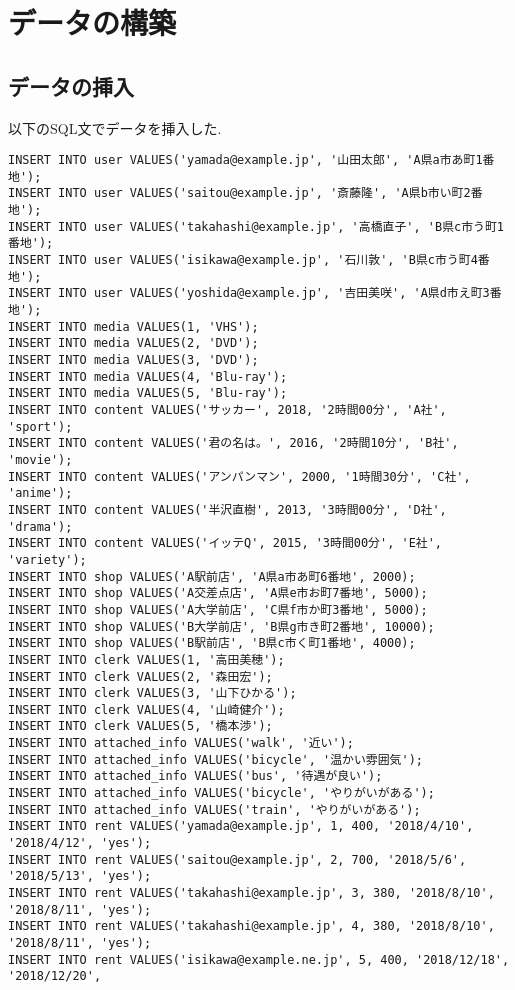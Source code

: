 \documentclass{jarticle}
\begin{document}
\section{データの構築}
\subsection{データの挿入}
以下のSQL文でデータを挿入した.
\begin{verbatim}
INSERT INTO user VALUES('yamada@example.jp', '山田太郎', 'A県a市あ町1番地');
INSERT INTO user VALUES('saitou@example.jp', '斎藤隆', 'A県b市い町2番地');
INSERT INTO user VALUES('takahashi@example.jp', '高橋直子', 'B県c市う町1番地');
INSERT INTO user VALUES('isikawa@example.jp', '石川敦', 'B県c市う町4番地');
INSERT INTO user VALUES('yoshida@example.jp', '吉田美咲', 'A県d市え町3番地');
INSERT INTO media VALUES(1, 'VHS');
INSERT INTO media VALUES(2, 'DVD');
INSERT INTO media VALUES(3, 'DVD');
INSERT INTO media VALUES(4, 'Blu-ray');
INSERT INTO media VALUES(5, 'Blu-ray');
INSERT INTO content VALUES('サッカー', 2018, '2時間00分', 'A社', 'sport');
INSERT INTO content VALUES('君の名は。', 2016, '2時間10分', 'B社', 'movie');
INSERT INTO content VALUES('アンパンマン', 2000, '1時間30分', 'C社', 'anime');
INSERT INTO content VALUES('半沢直樹', 2013, '3時間00分', 'D社', 'drama');
INSERT INTO content VALUES('イッテQ', 2015, '3時間00分', 'E社', 'variety');
INSERT INTO shop VALUES('A駅前店', 'A県a市あ町6番地', 2000);
INSERT INTO shop VALUES('A交差点店', 'A県e市お町7番地', 5000);
INSERT INTO shop VALUES('A大学前店', 'C県f市か町3番地', 5000);
INSERT INTO shop VALUES('B大学前店', 'B県g市き町2番地', 10000);
INSERT INTO shop VALUES('B駅前店', 'B県c市く町1番地', 4000);
INSERT INTO clerk VALUES(1, '高田美穂');
INSERT INTO clerk VALUES(2, '森田宏');
INSERT INTO clerk VALUES(3, '山下ひかる');
INSERT INTO clerk VALUES(4, '山崎健介');
INSERT INTO clerk VALUES(5, '橋本渉');
INSERT INTO attached_info VALUES('walk', '近い');
INSERT INTO attached_info VALUES('bicycle', '温かい雰囲気');
INSERT INTO attached_info VALUES('bus', '待遇が良い');
INSERT INTO attached_info VALUES('bicycle', 'やりがいがある');
INSERT INTO attached_info VALUES('train', 'やりがいがある');
INSERT INTO rent VALUES('yamada@example.jp', 1, 400, '2018/4/10', '2018/4/12', 'yes');
INSERT INTO rent VALUES('saitou@example.jp', 2, 700, '2018/5/6', '2018/5/13', 'yes');
INSERT INTO rent VALUES('takahashi@example.jp', 3, 380, '2018/8/10', '2018/8/11', 'yes');
INSERT INTO rent VALUES('takahashi@example.jp', 4, 380, '2018/8/10', '2018/8/11', 'yes');
INSERT INTO rent VALUES('isikawa@example.ne.jp', 5, 400, '2018/12/18', '2018/12/20', 

\end{verbatim}
\end{document}
